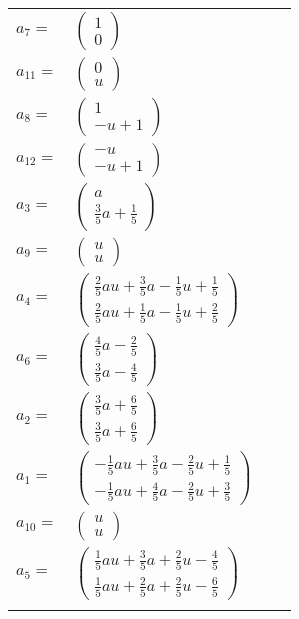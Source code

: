 \documentclass[1p]{elsarticle_modified}
\theoremstyle{definition}
\begin{document}
\begin{tabular}{m{7pt} m{180pt} m{7pt} m{180pt} }
\flushright $a_{7}=$&$\begin{pmatrix}1\\0\end{pmatrix}$ \\
\flushright $a_{11}=$&$\begin{pmatrix}0\\u\end{pmatrix}$ \\
\flushright $a_{8}=$&$\begin{pmatrix}1\\- u+1\end{pmatrix}$ \\
\flushright $a_{12}=$&$\begin{pmatrix}- u\\- u+1\end{pmatrix}$ \\
\flushright $a_{3}=$&$\begin{pmatrix}a\\\frac{3}{5} a+\frac{1}{5}\end{pmatrix}$ \\
\flushright $a_{9}=$&$\begin{pmatrix}u\\u\end{pmatrix}$ \\
\flushright $a_{4}=$&$\begin{pmatrix}\frac{2}{5} a u+\frac{3}{5} a-\frac{1}{5} u+\frac{1}{5}\\\frac{2}{5} a u+\frac{1}{5} a-\frac{1}{5} u+\frac{2}{5}\end{pmatrix}$ \\
\flushright $a_{6}=$&$\begin{pmatrix}\frac{4}{5} a-\frac{2}{5}\\\frac{3}{5} a-\frac{4}{5}\end{pmatrix}$ \\
\flushright $a_{2}=$&$\begin{pmatrix}\frac{3}{5} a+\frac{6}{5}\\\frac{3}{5} a+\frac{6}{5}\end{pmatrix}$ \\
\flushright $a_{1}=$&$\begin{pmatrix}-\frac{1}{5} a u+\frac{3}{5} a-\frac{2}{5} u+\frac{1}{5}\\-\frac{1}{5} a u+\frac{4}{5} a-\frac{2}{5} u+\frac{3}{5}\end{pmatrix}$ \\
\flushright $a_{10}=$&$\begin{pmatrix}u\\u\end{pmatrix}$ \\
\flushright $a_{5}=$&$\begin{pmatrix}\frac{1}{5} a u+\frac{3}{5} a+\frac{2}{5} u-\frac{4}{5}\\\frac{1}{5} a u+\frac{2}{5} a+\frac{2}{5} u-\frac{6}{5}\end{pmatrix}$\\&\end{tabular}
\end{document}
